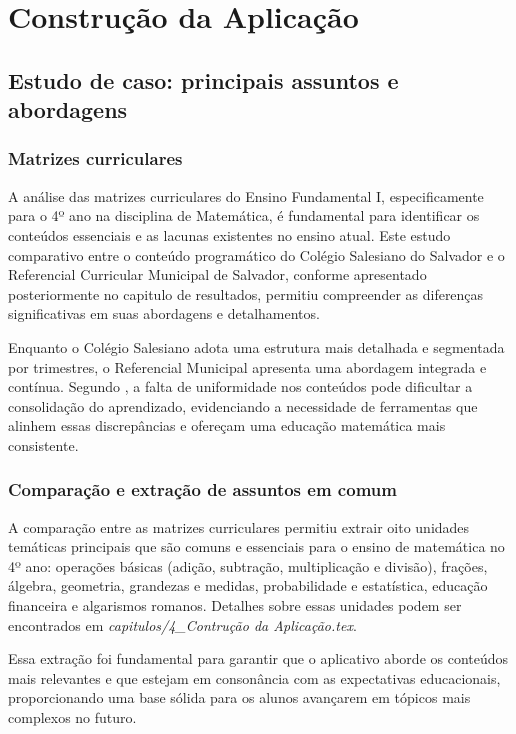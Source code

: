 \chapter{Construção da Aplicação}\label{chp:des}

\section{Estudo de caso: principais assuntos e abordagens}

\subsection{Matrizes curriculares}

A análise das matrizes curriculares do Ensino Fundamental I, especificamente para o 4º ano na disciplina de Matemática, é fundamental para identificar os conteúdos essenciais e as lacunas existentes no ensino atual. Este estudo comparativo entre o conteúdo programático do Colégio Salesiano do Salvador e o Referencial Curricular Municipal de Salvador, conforme apresentado posteriormente no capitulo de resultados, permitiu compreender as diferenças significativas em suas abordagens e detalhamentos.

Enquanto o Colégio Salesiano adota uma estrutura mais detalhada e segmentada por trimestres, o Referencial Municipal apresenta uma abordagem integrada e contínua. Segundo \cite{mesquita2023gamificacao}, a falta de uniformidade nos conteúdos pode dificultar a consolidação do aprendizado, evidenciando a necessidade de ferramentas que alinhem essas discrepâncias e ofereçam uma educação matemática mais consistente.

\subsection{Comparação e extração de assuntos em comum}

A comparação entre as matrizes curriculares permitiu extrair oito unidades temáticas principais que são comuns e essenciais para o ensino de matemática no 4º ano: operações básicas (adição, subtração, multiplicação e divisão), frações, álgebra, geometria, grandezas e medidas, probabilidade e estatística, educação financeira e algarismos romanos. Detalhes sobre essas unidades podem ser encontrados em \textit{capitulos/4\_Contrução da Aplicação.tex}.

Essa extração foi fundamental para garantir que o aplicativo aborde os conteúdos mais relevantes e que estejam em consonância com as expectativas educacionais, proporcionando uma base sólida para os alunos avançarem em tópicos mais complexos no futuro.

